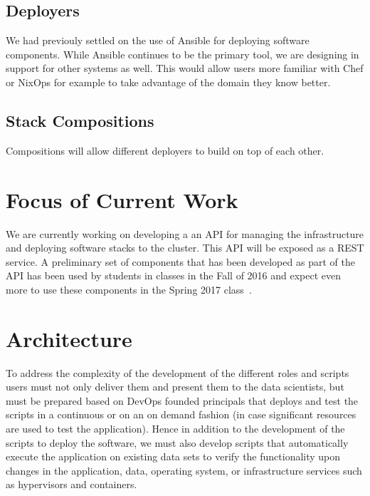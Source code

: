 \documentclass[9pt,twocolumn,twoside]{styles/osajnl}
\begin{document}
\subsection{Deployers}

We had previouly settled on the use of Ansible for deploying software
components. While Ansible continues to be the primary tool, we are
designing in support for other systems as well. This would allow users
more familiar with Chef or NixOps for example to take advantage of the
domain they know better.



\subsection{Stack Compositions}

Compositions will allow different deployers to build on top of each
other.




\section{Focus of Current Work}

We are currently working on developing a an API for managing the
infrastructure and deploying software stacks to the cluster. This API
will be exposed as a REST service. A preliminary set of components
that has been developed as part of the API has been used by students
in classes in the Fall of 2016 and expect even more to use these
components in the Spring 2017 class~\cite{www-i524}.


\section{Architecture}

To address the complexity of the development of the different roles
and scripts users must not only deliver them and present them to the
data scientists, but must be prepared based on DevOps founded
principals that deploys and test the scripts in a continuous or on an
on demand fashion (in case significant resources are used to test the
application). Hence in addition to the development of the scripts to
deploy the software, we must also develop scripts that automatically
execute the application on existing data sets to verify the
functionality upon changes in the application, data, operating system,
or infrastructure services such as hypervisors and containers.
\end{document}
